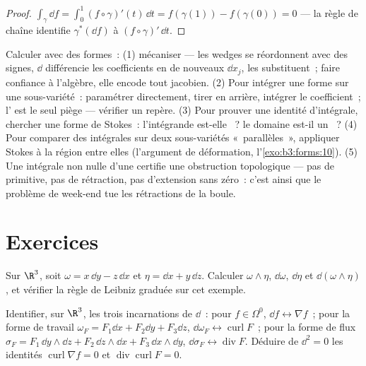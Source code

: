 \begin{proof}
$\int_\gamma\dd f = \int_0^1(f\circ\gamma)'(t)\,\dd t =
f(\gamma(1)) - f(\gamma(0)) = 0$ --- la règle de chaîne
identifie $\gamma^*(\dd f)$ à $(f\circ\gamma)'\,\dd t$.
\end{proof}

\begin{method}\label{met:b3:forms:method}
Calculer avec des formes~: (1) mécaniser --- les wedges se
réordonnent avec des signes, $\dd$ différencie les
coefficients en de nouveaux $\dd x_j$, les  substituent~; faire confiance à l'algèbre, elle
encode tout jacobien. (2) Pour intégrer une forme sur une
sous-variété~: paramétrer directement, tirer en arrière,
intégrer le coefficient~; l' est le seul piège ---
vérifier un repère. (3) Pour prouver une identité
d'intégrale, chercher une forme de Stokes~: l'intégrande
est-elle ~? le domaine est-il un ~? (4) Pour
comparer des intégrales sur deux sous-variétés «~parallèles~»,
appliquer Stokes à la région entre elles (l'argument de
déformation, l'\cref{exo:b3:forms:10}). (5) Une intégrale non
nulle d'une  certifie une obstruction
topologique --- pas de primitive, pas de rétraction, pas
d'extension sans zéro~: c'est ainsi que le problème de
week-end tue les rétractions de la boule.
\end{method}

\section{Exercices}

\begin{exercise}[$\star$]\label{exo:b3:forms:1}
Sur $\R^3$, soit $\omega = x\,\dd y - z\,\dd x$ et $\eta =
\dd x + y\,\dd z$. Calculer $\omega\wedge\eta$, $\dd\omega$,
$\dd\eta$ et $\dd(\omega\wedge\eta)$, et vérifier la règle
de Leibniz graduée sur cet exemple.
\end{exercise}

\begin{exercise}[$\star$]\label{exo:b3:forms:2}
Identifier, sur $\R^3$, les trois incarnations de $\dd$~:
pour $f \in \Omega^0$, $\dd f \leftrightarrow \nabla f$~;
pour la forme de travail $\omega_F = F_1\dd x + F_2\dd y +
F_3\dd z$, $\dd\omega_F \leftrightarrow
\operatorname{curl}F$~; pour la forme de flux $\sigma_F =
F_1\,\dd y\wedge\dd z + F_2\,\dd z\wedge\dd x + F_3\,\dd
x\wedge\dd y$, $\dd\sigma_F \leftrightarrow
\operatorname{div}F$. Déduire de $\dd^2 = 0$ les identités
$\operatorname{curl}\nabla f = 0$ et
$\operatorname{div}\operatorname{curl}F = 0$.
\end{exercise}

